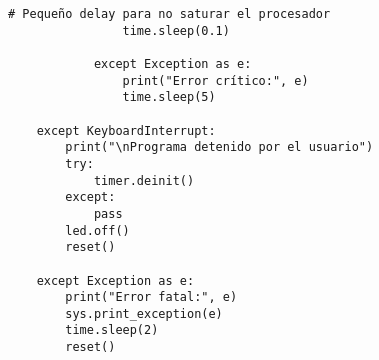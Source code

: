 \begin{lstlisting}[label=cod:firmware,caption=Firmware nodo sensor de consumos. , language=PythonUTF8]
                # Pequeño delay para no saturar el procesador
                time.sleep(0.1)
                
            except Exception as e:
                print("Error crítico:", e)
                time.sleep(5)
    
    except KeyboardInterrupt:
        print("\nPrograma detenido por el usuario")
        try:
            timer.deinit()
        except:
            pass
        led.off()
        reset()
    
    except Exception as e:
        print("Error fatal:", e)
        sys.print_exception(e)
        time.sleep(2)
        reset()
\end{lstlisting}